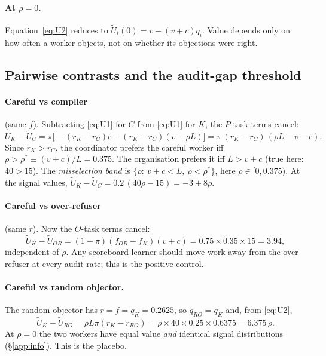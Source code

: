\documentclass[11pt,letterpaper]{article}
\newcommand{\rhostar}{\rho^{*}}
\newcommand{\Ut}{\tilde U}
\numberwithin{equation}{section}
\numberwithin{table}{section}
\numberwithin{figure}{section}
\numberwithin{algorithm}{section}
\begin{document}
\paragraph{At $\rho=0$.} Equation~\eqref{eq:U2} reduces to $\Ut_i(0)=v-(v+c)q_i$. Value depends only on how often a worker objects, not on whether its objections were right.

\subsection{Pairwise contrasts and the audit-gap threshold}

\paragraph{Careful vs complier} (same $f$). Subtracting \eqref{eq:U1} for $C$ from \eqref{eq:U1} for $K$, the $P$-task terms cancel:
\begin{equation}\label{eq:KC}
\Ut_K-\Ut_C=\pi\bigl[-(r_K-r_C)c-(r_K-r_C)(v-\rho L)\bigr]=\pi\,(r_K-r_C)\,(\rho L-v-c).
\end{equation}
Since $r_K>r_C$, the coordinator prefers the careful worker iff $\rho>\rhostar\equiv(v+c)/L=0.375$. The organisation prefers it iff $L>v+c$ (true here: $40>15$). The \emph{misselection band} is $\{\rho:\ v+c<L,\ \rho<\rhostar\}$, here $\rho\in[0,0.375)$. At the signal values, $\Ut_K-\Ut_C=0.2\,(40\rho-15)=-3+8\rho$.

\paragraph{Careful vs over-refuser} (same $r$). Now the $O$-task terms cancel:
\begin{equation}\label{eq:KOR}
\Ut_K-\Ut_{OR}=(1-\pi)(f_{OR}-f_K)(v+c)=0.75\times0.35\times15=3.94,
\end{equation}
independent of $\rho$. Any scoreboard learner should move work away from the over-refuser at every audit rate; this is the positive control.

\paragraph{Careful vs random objector.} The random objector has $r=f=q_K=0.2625$, so $q_{RO}=q_K$ and, from \eqref{eq:U2},
\begin{equation}\label{eq:KRO}
\Ut_K-\Ut_{RO}=\rho L\pi(r_K-r_{RO})=\rho\times40\times0.25\times0.6375=6.375\,\rho .
\end{equation}
At $\rho=0$ the two workers have equal value \emph{and} identical signal distributions (\S\ref{app:info}). This is the placebo.
\end{document}
